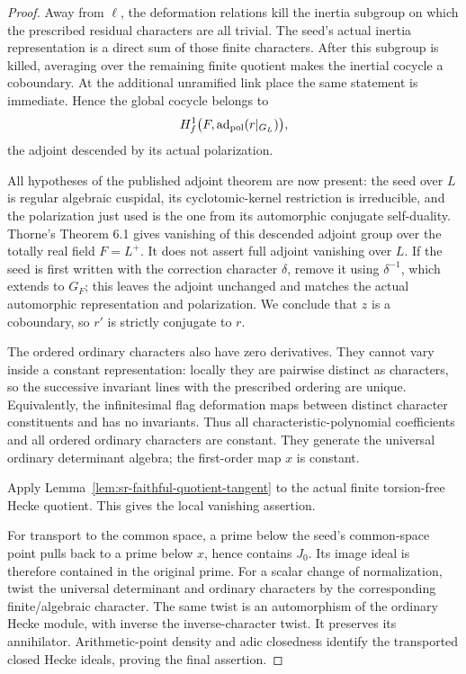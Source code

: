 \begin{proof}
Away from \(\ell\), the deformation relations kill the
inertia subgroup on which the prescribed residual characters
are all trivial.
The seed's actual inertia representation is a direct sum of
those finite characters.
After this subgroup is killed, averaging over the remaining
finite quotient makes the inertial cocycle a coboundary.
At the additional unramified link place the same statement
is immediate. Hence the global cocycle belongs to
\[
 H^1_f\bigl(F,\operatorname{ad}_{\rm pol}(r|_{G_L})\bigr),
\]
the adjoint descended by its actual polarization.

All hypotheses of the published adjoint theorem are now
present: the seed over \(L\) is regular algebraic cuspidal,
its cyclotomic-kernel restriction is irreducible, and the
polarization just used is the one from its automorphic
conjugate self-duality.
Thorne's Theorem 6.1 gives vanishing of this descended
adjoint group over the totally real field \(F=L^+\).
It does not assert full adjoint vanishing over \(L\).
If the seed is first written with the correction character
\(\delta\), remove it using \(\delta^{-1}\), which extends
to \(G_F\); this leaves the adjoint unchanged and matches
the actual automorphic representation and polarization.
We conclude that \(z\) is a coboundary, so \(r'\) is strictly
conjugate to \(r\).

The ordered ordinary characters also have zero derivatives.
They cannot vary inside a constant representation: locally
they are pairwise distinct as characters, so the successive
invariant lines with the prescribed ordering are unique.
Equivalently, the infinitesimal flag deformation maps between
distinct character constituents and has no invariants.
Thus all characteristic-polynomial coefficients and all
ordered ordinary characters are constant.
They generate the universal ordinary determinant algebra;
the first-order map \(x\) is constant.

Apply Lemma~\ref{lem:sr-faithful-quotient-tangent} to the
actual finite torsion-free Hecke quotient.
This gives the local vanishing assertion.

For transport to the common space, a prime below the
seed's common-space point pulls back to a prime below \(x\),
hence contains \(J_0\).
Its image ideal is therefore contained in the original prime.
For a scalar change of normalization, twist the universal
determinant and ordinary characters by the corresponding
finite/algebraic character.
The same twist is an automorphism of the ordinary Hecke
module, with inverse the inverse-character twist.
It preserves its annihilator. Arithmetic-point density and
adic closedness identify the transported closed Hecke
ideals, proving the final assertion.
\end{proof}

